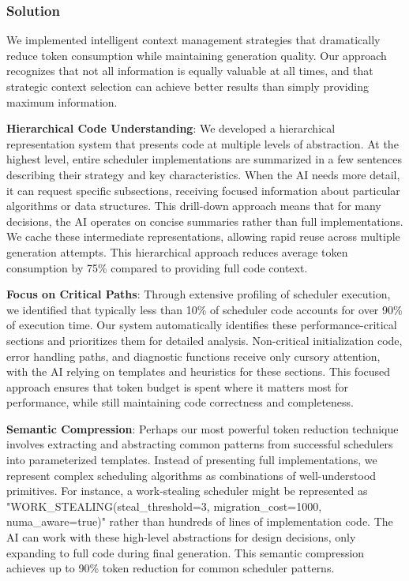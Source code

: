 \subsubsection{Solution}
We implemented intelligent context management strategies that dramatically reduce token consumption while maintaining generation quality. Our approach recognizes that not all information is equally valuable at all times, and that strategic context selection can achieve better results than simply providing maximum information.

\textbf{Hierarchical Code Understanding}: We developed a hierarchical representation system that presents code at multiple levels of abstraction. At the highest level, entire scheduler implementations are summarized in a few sentences describing their strategy and key characteristics. When the AI needs more detail, it can request specific subsections, receiving focused information about particular algorithms or data structures. This drill-down approach means that for many decisions, the AI operates on concise summaries rather than full implementations. We cache these intermediate representations, allowing rapid reuse across multiple generation attempts. This hierarchical approach reduces average token consumption by 75\% compared to providing full code context.

\textbf{Focus on Critical Paths}: Through extensive profiling of scheduler execution, we identified that typically less than 10\% of scheduler code accounts for over 90\% of execution time. Our system automatically identifies these performance-critical sections and prioritizes them for detailed analysis. Non-critical initialization code, error handling paths, and diagnostic functions receive only cursory attention, with the AI relying on templates and heuristics for these sections. This focused approach ensures that token budget is spent where it matters most for performance, while still maintaining code correctness and completeness.

\textbf{Semantic Compression}: Perhaps our most powerful token reduction technique involves extracting and abstracting common patterns from successful schedulers into parameterized templates. Instead of presenting full implementations, we represent complex scheduling algorithms as combinations of well-understood primitives. For instance, a work-stealing scheduler might be represented as "WORK\_STEALING(steal\_threshold=3, migration\_cost=1000, numa\_aware=true)" rather than hundreds of lines of implementation code. The AI can work with these high-level abstractions for design decisions, only expanding to full code during final generation. This semantic compression achieves up to 90\% token reduction for common scheduler patterns.

